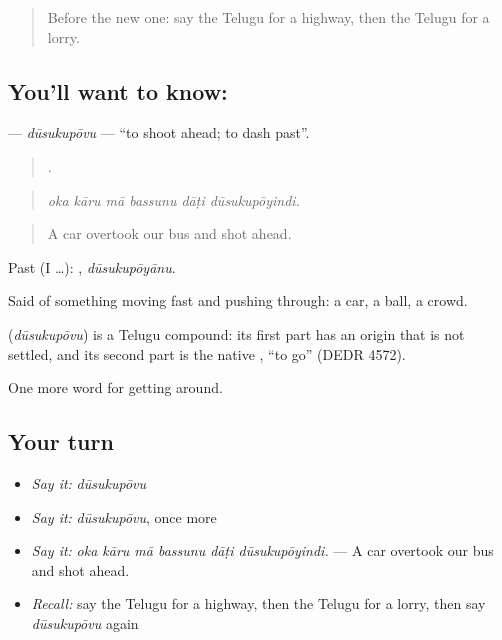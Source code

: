 \begin{quote}
Before the new one: say the Telugu for a highway, then the Telugu for a lorry.
\end{quote}

\subsection*{You'll want to know: }
\textbf{} — \emph{dūsukupōvu} — \textquotedblleft{}to shoot ahead; to dash past\textquotedblright{}.

\begin{quote}
     .
\end{quote}

\begin{quote}
\emph{oka kāru mā bassunu dāṭi dūsukupōyindi.}
\end{quote}

\begin{quote}
A car overtook our bus and shot ahead.
\end{quote}

Past (I …): , \emph{dūsukupōyānu}.

Said of something moving fast and pushing through: a car, a ball, a crowd.

\begin{cousinweb}
\textbf{} (\emph{dūsukupōvu}) is a Telugu compound: its first part has an origin that is not settled, and its second part is the native , \textquotedblleft{}to go\textquotedblright{} (DEDR 4572).
\end{cousinweb}

\begin{grammarlens}[title={What you've built}]
One more word for getting around.
\end{grammarlens}

\subsection*{Your turn}
\begin{itemize}
\raggedright
  \item \emph{Say it:} \emph{dūsukupōvu}
  \item \emph{Say it:} \emph{dūsukupōvu}, once more
  \item \emph{Say it:} \emph{oka kāru mā bassunu dāṭi dūsukupōyindi.} — A car overtook our bus and shot ahead.
  \item \emph{Recall:} say the Telugu for a highway, then the Telugu for a lorry, then say \emph{dūsukupōvu} again
\end{itemize}

